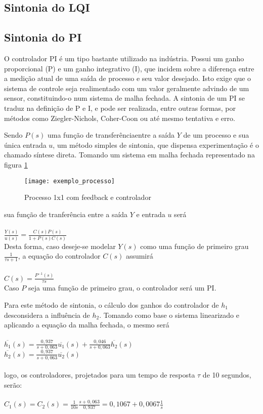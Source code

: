 \subsection{Sintonia do LQI}

\subsection{Sintonia do PI}

O controlador PI é um tipo bastante utilizado na indústria. Possui um ganho proporcional (P) e um ganho integrativo (I), que incidem sobre a diferença entre a medição atual de uma saída de processo e seu valor desejado. Isto exige que o sistema de controle seja realimentado com um valor geralmente advindo de um sensor, constituindo-o num sistema de malha fechada. A sintonia de um PI se traduz na definição de P e I, e pode ser realizada, entre outras formas, por métodos como Ziegler-Nichols, Coher-Coon ou até mesmo tentativa e erro.

Sendo $P(s)$ uma função de transferênciaentre a saída $Y$ de um processo e sua única entrada $u$, um método simples de sintonia, que dispensa experimentação é o chamado síntese direta.
Tomando um sistema em malha fechada representado na figura \ref{img_exemplo_processo}

\begin{figure}[H]
	\centering
	\texttt{[image: exemplo\_processo]}
	\caption{Processo 1x1 com feedback e controlador}
	\label{img_exemplo_processo}
\end{figure}

sua função de tranferência entre a saída $Y$ e entrada $u$ será
\\\\
$
\frac{Y(s)}{u(s)} = \frac{C(s)P(s)}{1+P(s)C(s)}
$
\\

Desta forma, caso deseje-se modelar $Y(s)$ como uma função de primeiro grau $\frac{1}{\tau s + 1}$, a equação do controlador $C(s)$ assumirá
\\\\
$
C(s) = \frac{P^{-1}(s)}{\tau s}
$
\\

Caso $P$ seja uma função de primeiro grau, o controlador será um PI.

Para este método de sintonia, o cálculo dos ganhos do controlador de $h_1$ desconsidera a influência de $h_2$. Tomando como base o sistema linearizado e aplicando a equação da malha fechada, o mesmo será
\\\\
$
\overline{h_1}(s) = \frac{0,937}{s + 0,063} \overline{u_1}(s) + \frac{0,046}{s + 0,063} \overline{h_2}(s) 
$
\\
$
\overline{h_2}(s) = \frac{0,937}{s + 0,063} \overline{u_2}(s)
$
\\\\
logo, os controladores, projetados para um tempo de resposta $\tau$ de 10 segundos, serão:
\\\\
$
C_1(s) = C_2(s) = \frac{1}{10s} \frac{s + 0,063}{0,937} = 0,1067 + 0,0067 \frac{1}{s}
$
\\

